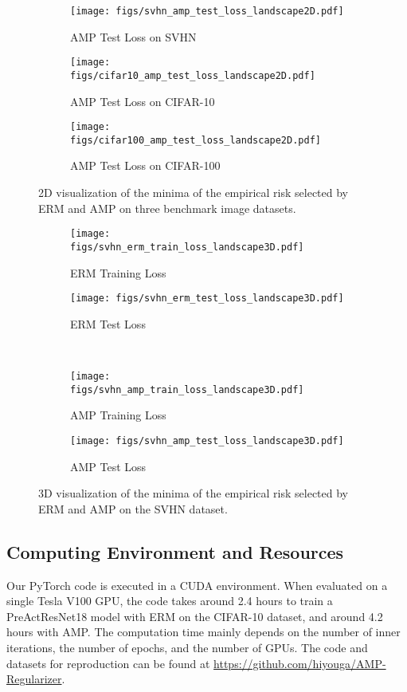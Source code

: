 \documentclass[final]{cvpr}
\begin{document}
\begin{figure*}[t]
\begin{subfigure}{0.66\columnwidth}\centering \captionsetup{width=0.9\columnwidth}\texttt{[image: figs/svhn\_amp\_test\_loss\_landscape2D.pdf]}\caption{AMP Test Loss on SVHN}\end{subfigure}\begin{subfigure}{0.66\columnwidth}\centering \captionsetup{width=0.9\columnwidth}\texttt{[image: figs/cifar10\_amp\_test\_loss\_landscape2D.pdf]}\caption{AMP Test Loss on CIFAR-10}\end{subfigure}\begin{subfigure}{0.66\columnwidth}\centering \captionsetup{width=0.9\columnwidth}\texttt{[image: figs/cifar100\_amp\_test\_loss\_landscape2D.pdf]}\caption{AMP Test Loss on CIFAR-100}\end{subfigure}\caption{2D visualization of the minima of the empirical risk selected by ERM and AMP on three benchmark image datasets.}
\label{fig:flatness2d}
\end{figure*}

\begin{figure*}[t]
\centering
\begin{subfigure}{0.9\columnwidth}\centering \captionsetup{width=0.9\columnwidth}\texttt{[image: figs/svhn\_erm\_train\_loss\_landscape3D.pdf]}\caption{ERM Training Loss}\end{subfigure}\begin{subfigure}{0.9\columnwidth}\centering \captionsetup{width=0.9\columnwidth}\texttt{[image: figs/svhn\_erm\_test\_loss\_landscape3D.pdf]}\caption{ERM Test Loss}\end{subfigure}\\
\begin{subfigure}{0.9\columnwidth}\centering \captionsetup{width=0.9\columnwidth}\texttt{[image: figs/svhn\_amp\_train\_loss\_landscape3D.pdf]}\caption{AMP Training Loss}\end{subfigure}\begin{subfigure}{0.9\columnwidth}\centering \captionsetup{width=0.9\columnwidth}\texttt{[image: figs/svhn\_amp\_test\_loss\_landscape3D.pdf]}\caption{AMP Test Loss}\end{subfigure}\caption{3D visualization of the minima of the empirical risk selected by ERM and AMP on the SVHN dataset.}
\label{fig:flatness3d}
\end{figure*}

\subsection{Computing Environment and Resources}

Our PyTorch code is executed in a CUDA environment. When evaluated on a single Tesla V100 GPU, the code takes around 2.4 hours to train a PreActResNet18 model with ERM on the CIFAR-10 dataset, and around 4.2 hours with AMP. The computation time mainly depends on the number of inner iterations, the number of epochs, and the number of GPUs. The code and datasets for reproduction can be found at \url{https://github.com/hiyouga/AMP-Regularizer}.
\end{document}
